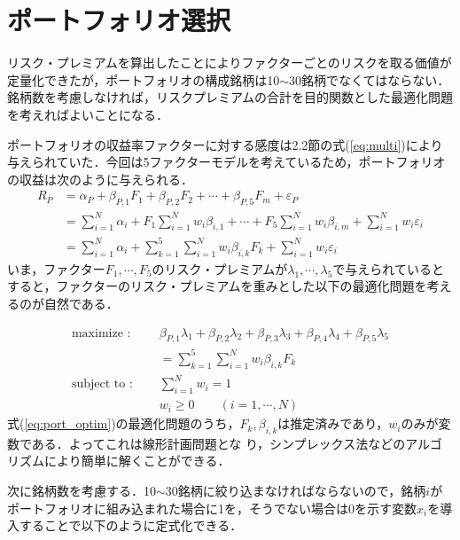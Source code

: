 ﻿\documentclass[11pt]{jreport}
\begin{document}
\section{ポートフォリオ選択}
リスク・プレミアムを算出したことによりファクターごとのリスクを取る価値が定量化できたが，ポートフォリオの構成銘柄は10$\sim$30銘柄でなくてはならない．銘柄数を考慮しなければ，リスクプレミアムの合計を目的関数とした最適化問題を考えればよいことになる．

ポートフォリオの収益率ファクターに対する感度は2.2節の式(\ref{eq:multi})により与えられていた．今回は5ファクターモデルを考えているため，ポートフォリオの収益は次のように与えられる．
\begin{equation}
\begin{split}
R_P &= \alpha_P + \beta_{P,1} F_1 + \beta_{P,2} F_2 + \cdots + \beta_{P,5} F_m + \varepsilon_P\\
&=\sum_{i=1}^N \alpha_i + F_1 \sum_{i=1}^N w_i \beta_{i,1} + \cdots + F_5 \sum_{i=1}^N w_i \beta_{i,m} + \sum_{i=1}^N w_i\varepsilon_i\\
&= \sum_{i=1}^N \alpha_i + \sum_{k=1}^5 \sum_{i=1}^N w_i \beta_{i,k} F_k + \sum_{i=1}^N w_i\varepsilon_i
\label{eq:port}
\end{split}
\end{equation}
いま，ファクター$F_1,\cdots,F_5$のリスク・プレミアムが$\lambda_1,\cdots,\lambda_5$で与えられているとすると，ファクターのリスク・プレミアムを重みとした以下の最適化問題を考えるのが自然である．

\begin{equation}
\begin{split}
\text{maximize : }\quad & \beta_{P,1}\lambda_1 + \beta_{P,2}\lambda_2 + \beta_{P,3}\lambda_3 + \beta_{P,4}\lambda_4 + \beta_{P,5}\lambda_5\\
& = \sum_{k=1}^5 \sum_{i=1}^N w_i \beta_{i,k} F_k\\
\text{subject to : }\quad & \sum_{i=1}^N w_i = 1\\
& w_i \geq 0\qquad(i=1,\cdots,N)
\end{split}
\label{eq:port_optim}
\end{equation}
式(\ref{eq:port_optim})の最適化問題のうち，$F_k, \beta_{i,k}$は推定済みであり，$w_i$のみが変数である．よってこれは線形計画問題とな
り，シンプレックス法などのアルゴリズムにより簡単に解くことができる．

次に銘柄数を考慮する．10$\sim$30銘柄に絞り込まなければならないので，銘柄$i$がポートフォリオに組み込まれた場合に1を，そうでない場合は0を示す変数$x_i$を導入することで以下のように定式化できる．
\end{document}
